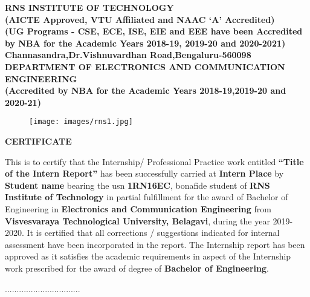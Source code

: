 %
\setlength{\toptafiddle}{1in}
\setlength{\bottafiddle}{1in}
\vspace*{-0.65in}
\enlargethispage{\bottafiddle}
\thispagestyle{empty}


\begin{center}
\small\textbf{{\color{blue}	RNS INSTITUTE OF TECHNOLOGY\\
(AICTE Approved, VTU Affiliated and NAAC `A' Accredited)\\
(UG Programs - CSE, ECE, ISE, EIE and EEE have been Accredited by NBA for the Academic Years 2018-19, 2019-20 and 2020-2021)\\
Channasandra,Dr.Vishnuvardhan Road,Bengaluru-560098}\\
\vspace{0.3cm}
DEPARTMENT OF ELECTRONICS AND COMMUNICATION ENGINEERING\\
(Accredited by NBA for the Academic Years 2018-19,2019-20 and 2020-21)
}
\end{center}

\begin{center}
\begin{figure}[h]
\centering
\texttt{[image: images/rns1.jpg]}
\end{figure}
\Large{\textbf{CERTIFICATE}}
\end{center}

This is to certify that the Internship/ Professional Practice work entitled \textbf{``Title of the Intern Report''} has been successfully carried at \textbf{Intern Place} by \textbf{Student name} bearing the usn \textbf{1RN16EC}, bonafide student of \textbf{\color{blue}RNS Institute of Technology} in partial fulfillment for the award of Bachelor of Engineering in \textbf{\color{blue}Electronics and Communication Engineering} from \textbf{\color{blue}Visvesvaraya Technological University, Belagavi}, during the year 2019-2020. It is certified that all corrections / suggestions indicated for internal assessment have been incorporated in the report. The Internship report has been approved as it satisfies the academic requirements in aspect of the Internship work prescribed for the award of degree of \textbf{\color{blue}Bachelor of Engineering}.

\vspace{1.0cm}
\begin{minipage}[t]{0.3\textwidth}%
\small{\color{gray!}................................}\\
{}\\
\\
\end{minipage}\hspace{0.06cm}

